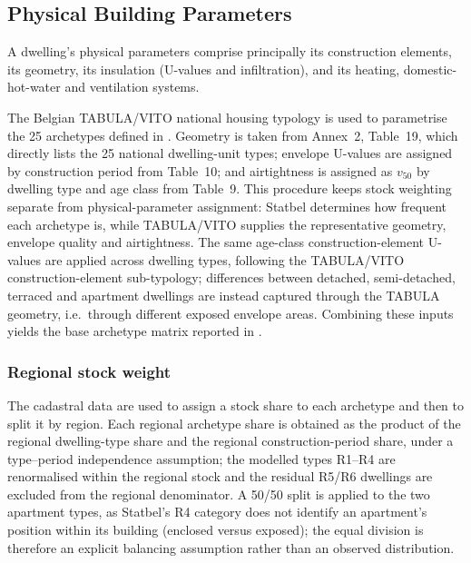 \subsection{Physical Building Parameters}
A dwelling's physical parameters comprise principally its construction elements,
its geometry, its insulation (U-values and infiltration), and its
heating, domestic-hot-water and ventilation systems.

The Belgian TABULA/VITO national housing typology is used to parametrise the 25
archetypes defined in  \cite{tabula_be_vito}. Geometry is
taken from Annex~2, Table~19, which directly lists the 25 national dwelling-unit
types; envelope U-values are assigned by construction period from Table~10; and
airtightness is assigned as $v_{50}$ by dwelling type and age class from
Table~9. This procedure keeps stock weighting separate from physical-parameter
assignment: Statbel determines how frequent each archetype is, while TABULA/VITO
supplies the representative geometry, envelope quality and airtightness. The same
age-class construction-element U-values are applied across dwelling types,
following the TABULA/VITO construction-element sub-typology; differences between
detached, semi-detached, terraced and apartment dwellings are instead captured
through the TABULA geometry, i.e.\ through different exposed envelope areas.
Combining these inputs yields the base archetype matrix reported in
.



\subsubsection*{Regional stock weight}
The cadastral data are used to assign a stock share to each archetype and then to
split it by region. Each regional archetype share is obtained as the product of
the regional dwelling-type share and the regional construction-period share,
under a type--period independence assumption; the modelled types R1--R4 are
renormalised within the regional stock and the residual R5/R6 dwellings are
excluded from the regional denominator. A 50/50 split is applied to the two
apartment types, as Statbel's R4 category does not identify an apartment's
position within its building (enclosed versus exposed); the equal division is
therefore an explicit balancing assumption rather than an observed distribution.
